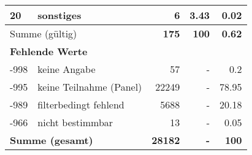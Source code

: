 \begin{longtable}{lXrrr}
     20 &
     \multicolumn{1}{X}{ sonstiges   } &


       \num{6} &
       \num[round-mode=places,round-precision=2]{3.43} &
         \num[round-mode=places,round-precision=2]{0.02} \\
     \midrule
     \multicolumn{2}{l}{Summe (gültig)} &
       \textbf{\num{175}} &
     \textbf{100} &
       \textbf{\num[round-mode=places,round-precision=2]{0.62}} \\
     \multicolumn{5}{l}{\textbf{Fehlende Werte}}\\
       -998 &
       keine Angabe &
         \num{57} &
        - &
         \num[round-mode=places,round-precision=2]{0.2} \\
       -995 &
       keine Teilnahme (Panel) &
         \num{22249} &
        - &
         \num[round-mode=places,round-precision=2]{78.95} \\
       -989 &
       filterbedingt fehlend &
         \num{5688} &
        - &
         \num[round-mode=places,round-precision=2]{20.18} \\
       -966 &
       nicht bestimmbar &
         \num{13} &
        - &
         \num[round-mode=places,round-precision=2]{0.05} \\
     \midrule
     \multicolumn{2}{l}{\textbf{Summe (gesamt)}} &
          \textbf{\num{28182}} &
        \textbf{-} &
        \textbf{100} \\
     \bottomrule
     \end{longtable}
     
